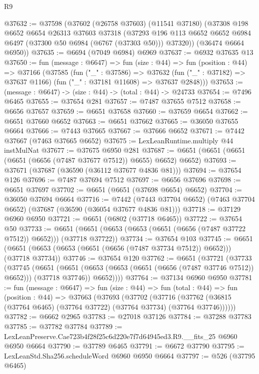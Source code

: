 \begin{lexlean}{R9}
\begin{coremodule}
@37632 := @37598
    (@37602
      (@26758 @37603)
      (@11541 @37180)
      (@37308
        @198
        @6652
        @6654
        @26313
        @37603
        @37318
        (@37293 @196 @113 @6652 @6652 @6984 @6497 (@37300 @50 @6984 (@6767 (@37303 @50))) @37320))
      (@36474 @6664 @6950))
@37635 := @6694 (@7049 @6984) @6969
@37637 := @6932 @37635 @13
@37650 := fun (message : @6647) =>
  fun (size : @44) =>
  fun (position : @44) =>
  @37166
    (@37585
      (fun ("_" : @37586) =>
      @37632 (fun ("_" : @37182) => @37637 @1166) (fun ("_" : @37181 @11608) => @37637 @2848)))
@37653 := (message : @6647) -> (size : @44) -> (total : @44) -> @24733
@37654 := @7496 @6465
@37655 := @37654 @281
@37657 := @7487 @37655 @7512
@37658 := @6656 @37657
@37659 := @6651 @37658
@37660 := @37659 @6654
@37662 := @6651 @37660 @6652
@37663 := @6651 @37662
@37665 := @36050 @37655 @6664
@37666 := @7443 @37665
@37667 := @37666 @6652
@37671 := @7442 @37667 (@7463 @37665 @6652)
@37675 := LexLeanRuntime.multiply @44 instMulNat
@37677 := @37675 @6950 @281
@37687 := @6651 (@6651 (@6651 (@6651 (@6656 (@7487 @37677 @7512)) @6655) @6652) @6652)
@37693 := @37671 (@37687 (@36590 (@36112 @37677 @4836 @81)))
@37694 := @37654 @126
@37696 := @7487 @37694 @7512
@37697 := @6656 @37696
@37698 := @6651 @37697
@37702 := @6651 (@6651 (@37698 @6654) @6652)
@37704 := @36050 @37694 @6664
@37716 := @7442
    (@7443 @37704 @6652)
    (@7463 @37704 @6652)
    (@37687 (@36590 (@36054 @37677 @4836 @81)))
@37718 := @37129 @6960 @6950
@37721 := @6651 (@6802 (@37718 @6465))
@37722 := @37654 @50
@37733 := @6651 (@6651 (@6653 (@6653 (@6651 (@6656 (@7487 @37722 @7512)) @6652))) (@37718 @37722))
@37734 := @37654 @103
@37745 := @6651 (@6651 (@6653 (@6653 (@6651 (@6656 (@7487 @37734 @7512)) @6652))) (@37718 @37734))
@37746 := @37654 @120
@37762 := @6651
    (@37721
      (@37733
        (@37745
          (@6651
            (@6651 (@6653 (@6653 (@6651 (@6656 (@7487 @37746 @7512)) @6652))) (@37718 @37746))
            @6652))))
@37764 := @37134 @6960 @6950
@37781 := fun (message : @6647) =>
  fun (size : @44) =>
  fun (total : @44) =>
  fun (position : @44) =>
  @37663
    (@37693
      (@37702
        (@37716 (@37762 (@36815 (@37764 @6465) (@37764 @37722) (@37764 @37734) (@37764 @37746))))))
@37782 := @6662 @2965
@37783 := @27018 @37126
@37784 := @37288 @37783
@37785 := @37782 @37784
@37789 := LexLeanPreserve.Cae723b4f28f25c6d220e7f7d64945ed3.R9.__fits_25 @6960 @6950 @6664
@37790 := @37789 @6465
@37791 := @6672 @37790
@37795 := LexLeanStd.Sha256.scheduleWord @6960 @6950 @6664
@37797 := @526 (@37795 @6465)

\end{coremodule}
\end{lexlean}
